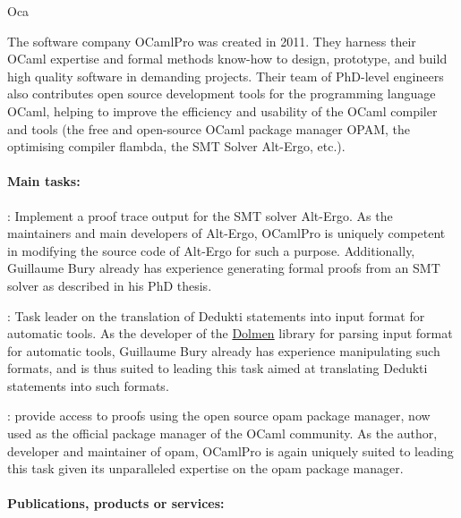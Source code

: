 \begin{sitedescription}{Oca}


The software company OCamlPro was created in 2011. They harness their OCaml expertise and formal methods know-how to design, prototype, and build high quality software in demanding projects. Their team of PhD-level engineers also contributes open source development tools for the programming language OCaml, helping to improve the efficiency and usability of the OCaml compiler and tools (the free and open-source OCaml package manager OPAM, the optimising compiler flambda, the SMT Solver Alt-Ergo, etc.).

\paragraph*{Main tasks:}

\begin{compactitem}
\item {}: Implement a proof trace output for
  the SMT solver Alt-Ergo. As the maintainers and main developers of Alt-Ergo,
  OCamlPro is uniquely competent in modifying the source code of Alt-Ergo
  for such a purpose. Additionally, Guillaume Bury already has experience
  generating formal proofs from an SMT solver as described in his PhD
  thesis\cite{BURY19}.
\item {}: Task leader on the translation of
  Dedukti statements into input format for automatic tools. As the developer
  of the \href{https://github.com/Gbury/dolmen}{Dolmen} library for parsing input format for automatic
  tools, Guillaume Bury already has experience manipulating such formats,
  and is thus suited to leading this task aimed at translating Dedukti
  statements into such formats.
\item {}: provide access to proofs using the open source opam
  package manager, now used as the official package manager of the OCaml community. 
  As the author, developer and maintainer of opam,
  OCamlPro is again uniquely suited to leading this task given its
  unparalleled expertise on the opam package manager.
\end{compactitem}

\paragraph*{Publications, products or services:}


\end{sitedescription}
